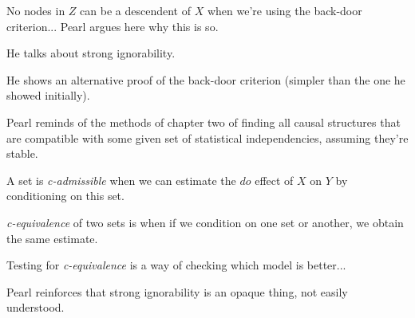 No nodes in $Z$ can be a descendent of $X$ when we're using the back-door criterion... Pearl argues here why this is so.

He talks about strong ignorability.

He shows an alternative proof of the back-door criterion (simpler than the one he showed initially).

Pearl reminds of the methods of chapter two of finding all causal structures that are compatible with some given set of statistical independencies, assuming they're stable.

A set is \textit{c-admissible} when we can estimate the $do$ effect of $X$ on $Y$ by conditioning on this set.

\textit{c-equivalence} of two sets is when if we condition on one set or another, we obtain the same estimate.

Testing for \textit{c-equivalence} is a way of checking which model is better...

Pearl reinforces that strong ignorability is an opaque thing, not easily understood.


